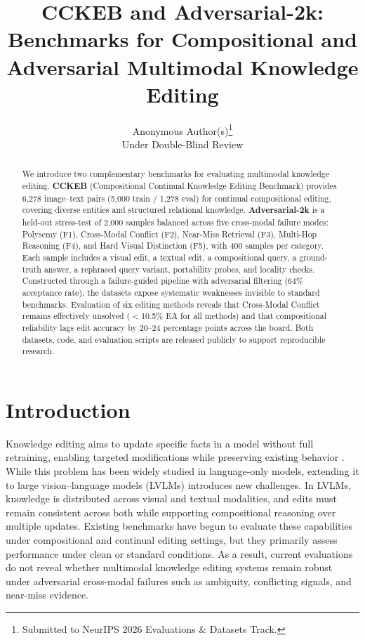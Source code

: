 \documentclass{article}
\title{CCKEB and Adversarial-2k: Benchmarks for Compositional and Adversarial Multimodal Knowledge Editing}
\author{%
  Anonymous Author(s)\thanks{Submitted to NeurIPS 2026 Evaluations \& Datasets Track.} \\
  Under Double-Blind Review\\
}
\begin{document}
\maketitle


\begin{abstract}
We introduce two complementary benchmarks for evaluating multimodal knowledge editing. \textbf{CCKEB} (Compositional Continual Knowledge Editing Benchmark) provides 6{,}278 image--text pairs (5{,}000 train / 1{,}278 eval) for continual compositional editing, covering diverse entities and structured relational knowledge. \textbf{Adversarial-2k} is a held-out stress-test of 2{,}000 samples balanced across five cross-modal failure modes: Polysemy (F1), Cross-Modal Conflict (F2), Near-Miss Retrieval (F3), Multi-Hop Reasoning (F4), and Hard Visual Distinction (F5), with 400 samples per category. Each sample includes a visual edit, a textual edit, a compositional query, a ground-truth answer, a rephrased query variant, portability probes, and locality checks. Constructed through a failure-guided pipeline with adversarial filtering (64\% acceptance rate), the datasets expose systematic weaknesses invisible to standard benchmarks. Evaluation of six editing methods reveals that Cross-Modal Conflict remains effectively unsolved ($<$10.5\% EA for all methods) and that compositional reliability lags edit accuracy by 20--24 percentage points across the board. Both datasets, code, and evaluation scripts are released publicly to support reproducible research.
\end{abstract}



\section{Introduction}
\label{sec:intro}


Knowledge editing aims to update specific facts in a model without full retraining, enabling targeted modifications while preserving existing behavior \cite{editing23,easyedit24,KE_24survey}. While this problem has been widely studied in language-only models, extending it to large vision--language models (LVLMs) \cite{BLIP-2_2023,minigpt24} introduces new challenges. In LVLMs, knowledge is distributed across visual and textual modalities, and edits must remain consistent across both while supporting compositional reasoning over multiple updates. Existing benchmarks have begun to evaluate these capabilities under compositional and continual editing settings, but they primarily assess performance under clean or standard conditions. As a result, current evaluations do not reveal whether multimodal knowledge editing systems remain robust under adversarial cross-modal failures such as ambiguity, conflicting signals, and near-miss evidence.
\end{document}
